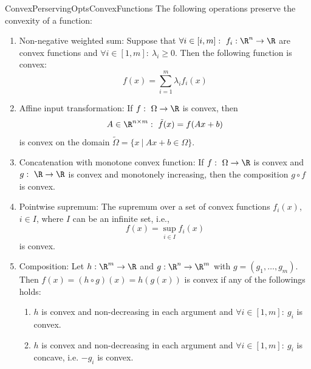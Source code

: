 \begin{pro}{ConvexPerservingOptsConvexFunctions}
    The following operations preserve the convexity of a function:
    \begin{enumerate}
        \item 
            Non-negative weighted sum: Suppose that $\forall i \in [i,m]: \ f_i: \R^n \rightarrow \R$ are convex functions and $\forall i \in [1,m]: \ \lambda_i \geq 0$. Then the following function is convex:
                \begin{equation*}
                    f(x) = \sum_{i=1}^m \lambda_i f_i(x)
                \end{equation*}
        \item 
            Affine input transformation: If $f: \ \Omega \rightarrow \R$ is convex, then
            \begin{equation*}
                A \in \R^{n \times m}: \ \tilde{f}(x) = f(Ax + b)
            \end{equation*}
            is convex on the domain $\tilde{\Omega} = \{x \ | \ Ax + b \in \Omega\}$.
        \item 
            Concatenation with monotone convex function: If $f: \ \Omega \rightarrow \R$ is convex and $g: \ \R \rightarrow \R$ is convex and monotonely increasing, then the composition $g \circ f$ is convex.
        \item 
            Pointwise supremum: The supremum over a set of convex functions $f_i(x)$, $i \in I$, where $I$ can be an infinite set, i\@.e\@.,
            \begin{equation*}
                f(x) = \sup_{i \in I} f_i(x)
            \end{equation*}
            is convex.
        \item 
            Composition: Let $h: \R^m \rightarrow \R$ and $g: \R^n \rightarrow \R^m$ with $g = (g_1, \ldots, g_m)$. Then $f(x) = (h \circ g)(x) = h(g(x))$ is convex if any of the followings holds: 
            \begin{enumerate}
                \item 
                    $h$ is convex and non-decreasing in each argument and $\forall i \in [1,m]: \ g_i$ is convex.
                \item 
                    $h$ is convex and non-decreasing in each argument and $\forall i \in [1,m]: \ g_i$ is concave, i\@.e\@. $-g_i$ is convex.
            \end{enumerate}
    \end{enumerate}
    \vspace*{-0.2cm}
\end{pro}

